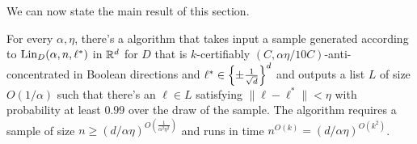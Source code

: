 We can now state the main result of this section.


\begin{theorem}
For every $\alpha, \eta$, there's a algorithm that takes input a sample generated according to $\mathrm{Lin}_D(\alpha,n,\ell^*)$ in $\mathbb R^d$ for $D$ that is $k$-certifiably $(C,\alpha \eta/10C)$-anti-concentrated in Boolean directions and $\ell^* \in \left\{\pm{\frac{1}{\sqrt{d}}}\right\}^d$ and outputs a list $L$ of size $O(1/\alpha)$ such that there's an $\ell \in L$ satisfying $\|\ell-\ell^*\| <\eta$ with probability at least $0.99$ over the draw of the sample. The algorithm requires a sample of size $n \geq (d/\alpha \eta)^{O(\frac{1}{\alpha^2 \eta^2})}$ and runs in time $n^{O(k)} = (d/\alpha\eta)^{O(k^2)}$. \label{thm:Booleanmain}
\end{theorem}





